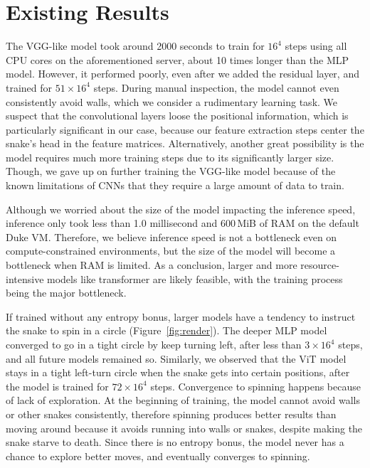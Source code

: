 \documentclass[conference]{IEEEtran}
\newcommand{\todo}[1]{\textcolor{red}{[ #1 ]}}
\renewcommand{\todo}[1]{} %
\begin{document}
\section{Existing Results}

\todo{Demonstrate all the existing results you obtained.}

The VGG-like model took around 2000 seconds to train for $16^4$ steps using all
CPU cores on the aforementioned server,
about 10 times longer than the MLP model. However, it performed poorly,
even after we added the residual layer, and trained for $51 \times 16^4$ steps.
During manual inspection, the model cannot even consistently avoid walls,
which we consider a rudimentary learning task.
We suspect that the convolutional layers loose the positional information,
which is particularly significant in our case,
because our feature extraction steps center the snake's head in the feature
matrices. Alternatively,
another great possibility is the model requires much more training steps due to
its significantly larger size. Though,
we gave up on further training the VGG-like model because of the known
limitations of CNNs that they require a large amount of data to train.

Although we worried about the size of the model impacting the inference speed,
inference only took less than 1.0 millisecond and 600\,MiB of RAM on the default
Duke VM. Therefore,
we believe inference speed is not a bottleneck even on compute-constrained
environments,
but the size of the model will become a bottleneck when RAM is limited.
As a conclusion,
larger and more resource-intensive models like transformer are likely feasible,
with the training process being the major bottleneck.

If trained without any entropy bonus,
larger models have a tendency to instruct the snake to spin in a circle
(Figure~\ref{fig:render}).
The deeper MLP model converged to go in a tight circle by keep turning left,
after less than $3\times 16^4$ steps, and all future models remained so.
Similarly,
we observed that the ViT model stays in a tight left-turn circle when the
snake gets into certain positions,
after the model is trained for $72\times 16^4$ steps.
Convergence to spinning happens because of lack of exploration.
At the beginning of training,
the model cannot avoid walls or other snakes consistently,
therefore spinning produces better results than moving around because it avoids
running into walls or snakes, despite making the snake starve to death.
Since there is no entropy bonus,
the model never has a chance to explore better moves,
and eventually converges to spinning.
\end{document}
